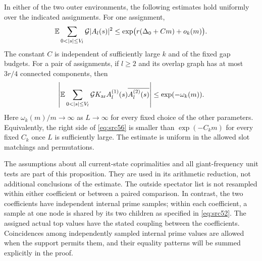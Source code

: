 \begin{proposition}
\label{prop:comparisons}
In either of the two outer environments, the following estimates
hold uniformly over the indicated assignments.  For one
assignment,
\begin{equation}
       \E\sum_{0<|s|\le V_l}\mathcal G|A_l(s)|^2
           \le\exp\bigl(r(\Delta_0+Cm)+o_k(m)\bigr).
 \label{eq:src55}
\end{equation}
The constant $C$ is independent of sufficiently large $k$ and of
the fixed gap budgets.  For a pair of assignments, if $l\ge2$ and
its overlap graph has at most $3r/4$ connected components, then
\begin{equation}
 \left|\E\sum_{0<|s|\le V_l}\mathcal G K_{\rm ar}
            A_l^{(1)}(s)\overline{A_l^{(2)}(s)}\right|
                        \le\exp(-\omega_k(m)).
 \label{eq:src56}
\end{equation}
Here $\omega_k(m)/m\to\infty$ as $L\to\infty$ for every fixed
choice of the other parameters.  Equivalently, the right side of
\eqref{eq:src56} is smaller than $\exp(-C_km)$ for every fixed
$C_k$ once $L$ is sufficiently large.  The estimate is uniform in
the allowed slot matchings and permutations.
\end{proposition}

The assumptions about all current-state coprimalities and all
giant-frequency unit tests are part of this proposition.  They are
used in its arithmetic reduction, not additional conclusions of
the estimate.  The outside spectator list is not resampled within
either coefficient or between a paired comparison.  In contrast,
the two coefficients have independent internal prime samples;
within each coefficient, a sample at one node is shared by its
two children as specified in \eqref{eq:src52}.  The assigned actual
top values have the stated coupling between the coefficients.
Coincidences among independently sampled internal prime values
are allowed when the support permits them, and their equality
patterns will be summed explicitly in the proof.
